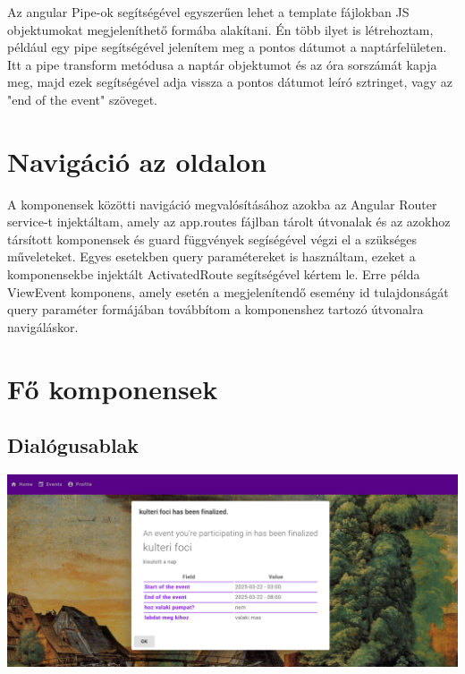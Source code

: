 \documentclass[a4paper,12pt]{report}
\theoremstyle{definition}
\theoremstyle{remark}
\begin{document}
Az angular Pipe-ok\cite{Pipewebsite} segítségével egyszerűen lehet a template fájlokban JS objektumokat megjeleníthető formába alakítani. Én több ilyet is létrehoztam, például egy pipe segítségével jelenítem meg a pontos dátumot a naptárfelületen. Itt a pipe transform metódusa a naptár objektumot és az óra sorszámát kapja meg, majd ezek segítségével adja vissza a pontos dátumot leíró sztringet, vagy az "end of the event" szöveget.

\section{Navigáció az oldalon}

A komponensek közötti navigáció megvalósításához azokba az Angular Router service-t\cite{Routerwebsite} injektáltam, amely az app.routes fájlban tárolt útvonalak és az azokhoz társított komponensek és guard függvények segíségével végzi el a szükséges műveleteket. Egyes esetekben query paramétereket is használtam, ezeket a komponensekbe injektált ActivatedRoute segítségével kértem le. Erre példa ViewEvent komponens, amely esetén a megjelenítendő esemény id tulajdonságát query paraméter formájában továbbítom a komponenshez tartozó útvonalra navigáláskor.

\section{Fő komponensek}

	\subsection{Dialógusablak}

\begin{center}
\includegraphics[width=150mm]{notification}
\captionsetup{width=0.8\linewidth}
\label{notification}
\end{center}
\end{document}
